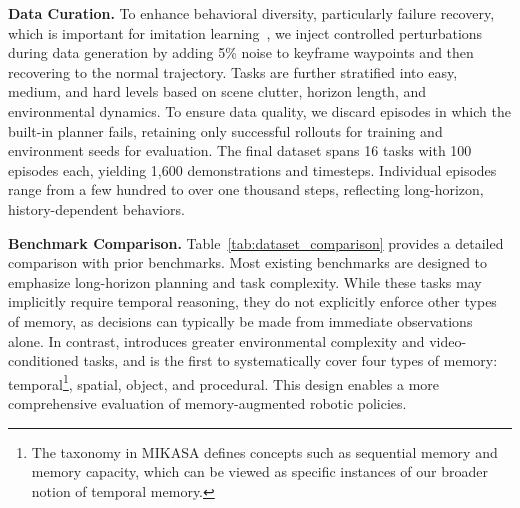 \noindent\textbf{Data Curation.}
To enhance behavioral diversity, particularly failure recovery, which is important for imitation learning~\cite{dai2025racer}, we inject controlled perturbations during data generation by adding 5\% noise to keyframe waypoints and then recovering to the normal  trajectory. Tasks are further stratified into easy, medium, and hard levels based on scene clutter, horizon length, and environmental dynamics. To ensure data quality, we discard episodes in which the built-in planner fails, retaining only successful rollouts for training and environment seeds for evaluation. The final dataset spans 16 tasks with 100 episodes each, yielding 1,600 demonstrations and \trainsteps\xspace  timesteps. Individual episodes range from a few hundred to over one thousand steps, reflecting long-horizon, history-dependent behaviors.

\noindent\textbf{Benchmark Comparison.}
Table~\ref{tab:dataset_comparison} provides a detailed comparison with prior benchmarks. Most existing benchmarks \cite{han2025robocerebra, zhang2025vlabench, mees2022calvin} are designed to emphasize long-horizon planning and task complexity. While these tasks may implicitly require temporal reasoning, they do not explicitly enforce other types of memory, as decisions can typically be made from immediate observations alone. 
In contrast, \benchname\xspace introduces greater environmental complexity and video-conditioned tasks, and is the first to systematically cover four types of memory: temporal\footnote{The taxonomy in MIKASA \cite{cherepanov2025memory} defines concepts such as sequential memory and memory capacity, which can be viewed as specific instances of our broader notion of temporal memory.}, spatial, object, and procedural. This design enables a more comprehensive evaluation of memory-augmented robotic policies.